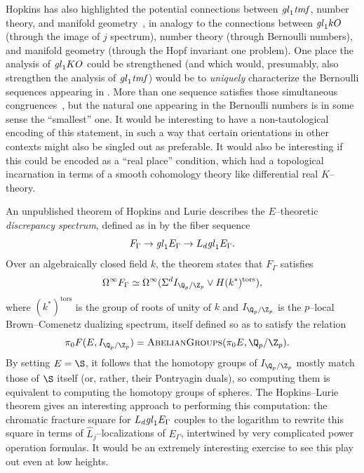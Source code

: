 Hopkins has also highlighted the potential connections between \(\mathit{gl}_1 \mathit{tmf}\), number theory, and manifold geometry~\cite{HopkinsTheStringOrientation}, in analogy to the connections between \(\mathit{gl}_1 kO\) (through the image of \(j\) spectrum), number theory (through Bernoulli numbers), and manifold geometry (through the Hopf invariant one problem).
One place the analysis of \(\mathit{gl}_1 KO\) could be strengthened (and which would, presumably, also strengthen the analysis of \(\mathit{gl}_1 \mathit{tmf}\)) would be to \emph{uniquely} characterize the Bernoulli sequences appearing in .
More than one sequence satisfies those simultaneous congruences~\cite{SprangNaumann}, but the natural one appearing in the Bernoulli numbers is in some sense the ``smallest'' one.
It would be interesting to have a non-tautological encoding of this statement, in such a way that certain orientations in other contexts might also be singled out as preferable.
It would also be interesting if this could be encoded as a ``real place'' condition, which had a topological incarnation in terms of a smooth cohomology theory like differential real \(K\)--theory.

An unpublished theorem of Hopkins and Lurie describes the \(E\)--theoretic \textit{discrepancy spectrum}, defined as in  by the fiber sequence \[F_\Gamma \to \mathit{gl}_1 E_\Gamma \to L_d \mathit{gl}_1 E_\Gamma.\]
Over an algebraically closed field \(k\), the theorem states that \(F_\Gamma\) satisfies \[\Loops^\infty F_\Gamma \simeq \Loops^\infty (\Susp^d I_{\Q_p/\Z_p} \vee H(k^*)^{\mathrm{tors}}),\] where \((k^*)^{\mathrm{tors}}\) is the group of roots of unity of \(k\) and \(I_{\Q_p/\Z_p}\) is the \(p\)--local Brown--Comenetz dualizing spectrum, itself defined so as to satisfy the relation
\begin{align*}
\pi_0 F(E, I_{\Q_p/\Z_p}) & = \CatOf{AbelianGroups}(\pi_0 E, \Q_p/\Z_p).
\end{align*}
By setting \(E = \S\), it follows that the homotopy groups of \(I_{\Q_p/\Z_p}\) mostly match those of \(\S\) itself (or, rather, their Pontryagin duals), so computing them is equivalent to computing the homotopy groups of spheres.
The Hopkins--Lurie theorem gives an interesting approach to performing this computation: the chromatic fracture square for \(L_d \mathit{gl}_1 E_\Gamma\) couples to the logarithm to rewrite this square in terms of \(\widehat L_j\)--localizations of \(E_\Gamma\), intertwined by very complicated power operation formulas.
It would be an extremely interesting exercise to see this play out even at low heights.

